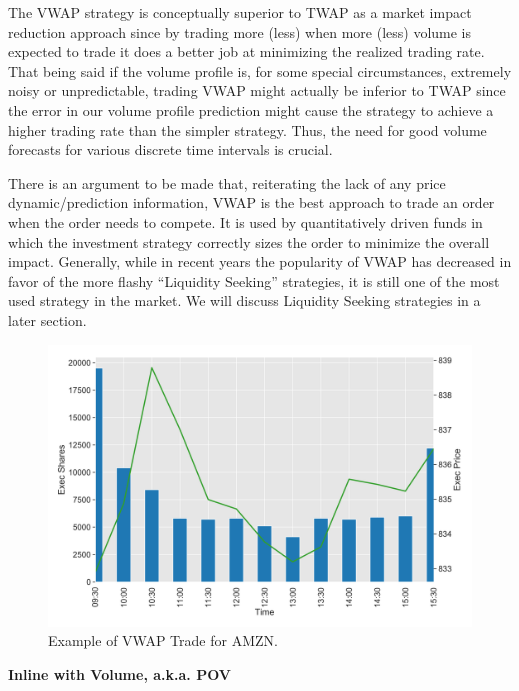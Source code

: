 The VWAP strategy is conceptually superior to TWAP as a market impact reduction approach since by trading more (less) when more  (less) volume is expected to trade it does a better job at minimizing the realized trading rate. That being said if the volume profile is, for some special circumstances, extremely noisy or unpredictable, trading VWAP might actually be inferior to TWAP since the error in our volume profile prediction might cause the strategy to achieve a higher trading rate than the simpler strategy. Thus, the need for good volume forecasts for various discrete time intervals is crucial.


There is an argument to be made that, reiterating the lack of any price dynamic/prediction information, VWAP is the best approach to trade an order when the order needs to compete. It is used by quantitatively driven funds in which the investment strategy correctly sizes the order to minimize the overall impact. Generally, while in recent years the popularity of VWAP has decreased in favor of the more flashy ``Liquidity Seeking'' strategies, it is still one of the most used strategy in the market. We will discuss Liquidity Seeking strategies in a later section. \label{in:twap2} \twomedskip


        \begin{figure}[!ht]
        \centering
        \includegraphics[width=\textwidth]{chapters/chapter_exec_models/figures/vwap.png} 
        \caption{Example of VWAP Trade for AMZN.\label{fig:vwap_amzn}}
        \end{figure}


\noindent\textbf{Inline with Volume, a.k.a. POV} \label{in:pov2} \twomedskip


